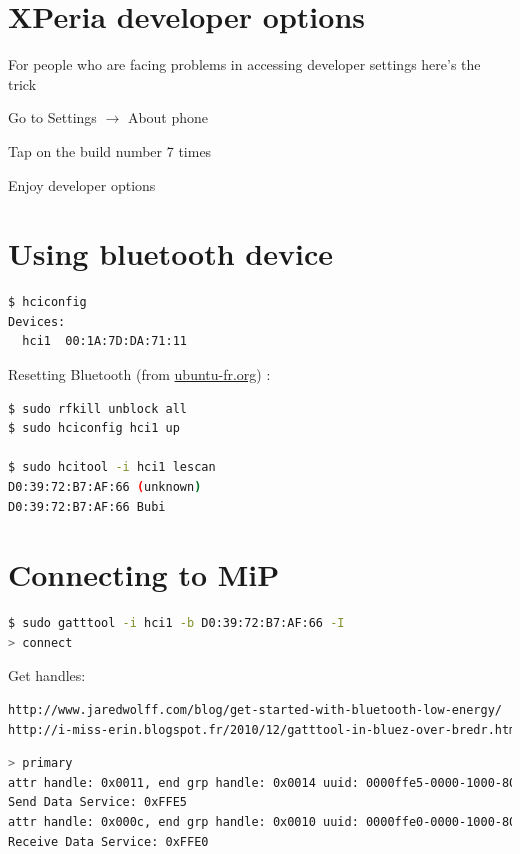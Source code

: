\documentclass[a4paper,10pt]{article}
\begin{document}
\section{XPeria developer options}
For people who are facing problems in accessing developer settings here's the trick 

Go to Settings $\rightarrow$ About phone

Tap on the build number 7 times 

Enjoy developer options 

\section{Using bluetooth device}
\begin{lstlisting}[language=bash]
$ hciconfig
Devices:
  hci1  00:1A:7D:DA:71:11 
\end{lstlisting}

Resetting Bluetooth (from 
\href{http://doc.ubuntu-fr.org/bluetooth\#problemes\_connus}{ubuntu-fr.org}) :
\begin{lstlisting}[language=bash]
$ sudo rfkill unblock all
$ sudo hciconfig hci1 up

$ sudo hcitool -i hci1 lescan
D0:39:72:B7:AF:66 (unknown)
D0:39:72:B7:AF:66 Bubi
\end{lstlisting}

\section{Connecting to MiP}

\begin{lstlisting}[language=bash]
$ sudo gatttool -i hci1 -b D0:39:72:B7:AF:66 -I
> connect
\end{lstlisting}

Get handles:
\begin{lstlisting}[language=bash]
http://www.jaredwolff.com/blog/get-started-with-bluetooth-low-energy/ 
http://i-miss-erin.blogspot.fr/2010/12/gatttool-in-bluez-over-bredr.html 
\end{lstlisting}

\begin{lstlisting}[language=bash]
> primary
attr handle: 0x0011, end grp handle: 0x0014 uuid: 0000ffe5-0000-1000-8000-00805f9b34fb
Send Data Service: 0xFFE5
attr handle: 0x000c, end grp handle: 0x0010 uuid: 0000ffe0-0000-1000-8000-00805f9b34fb
Receive Data Service: 0xFFE0
\end{lstlisting}
\end{document}

